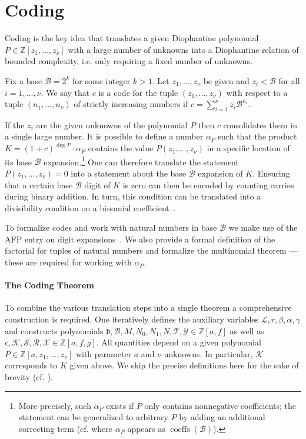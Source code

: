 \documentclass[a4paper,USenglish,cleveref,autoref,thm-restate]{lipics-v2021}
\newcommand{\Z}{{\mathbb Z}}
\newcommand{\B}{\mathscr{B}}
\newcommand{\thmIdec}{\mathscr}
\newcommand{\X}{\thmIdec X}
\newcommand{\K}{\thmIdec K}
\newcommand{\Y}{\thmIdec Y}
\DeclareMathOperator{\coeffs}{coeffs}
\begin{document}
\section{Coding}
Coding is the key idea that translates a given Diophantine polynomial $P \in \Z[z_1, \ldots, z_\nu]$ with a large number of unknowns into a Diophantine relation of bounded complexity, i.e. only requiring a fixed number of unknowns.

\begin{definition}[Code] \label{def:code}
Fix a base $\B = 2^k$ for some integer $k > 1$. Let $z_1, \ldots, z_\nu$ be given and $z_i < \B$ for all $i=1, \ldots, \nu$. We say that $c$ is a code for the tuple $(z_1, \ldots, z_\nu)$ with respect to a tuple $(n_1, \ldots, n_\nu)$ of strictly increasing numbers if $c = \sum_{i=1}^\nu z_i \B^{n_i}$.
\end{definition}

If the $z_i$ are the given unknowns of the polynomial $P$ then $c$ consolidates them in a single large number. It is possible to define a number $\alpha_P$ such that the product $K = (1 + c)^{\deg P} \cdot \alpha_P$ contains the value $P(z_1, \ldots, z_\nu)$ in a specific location of its base $\B$ expansion.\footnote{More precisely, such $\alpha_P$ exists if $P$ only contains nonnegative coefficients; the statement can be generalized to arbitrary $P$ by adding an additional correcting term (cf. \cite[Lemma 1.8]{manuscript} where $\alpha_P$ appears as $\coeffs(\B)$).} One can therefore translate the statement $P(z_1, \ldots, z_\nu) = 0$ into a statement about the base $\B$ expansion of $K$. Ensuring that a certain base $\B$ digit of $K$ is zero can then be encoded by counting carries during binary addition. In turn, this condition can be translated into a divisibility condition on a binomial coefficient~\cite[Lemmas~1.3 and~1.4]{manuscript}. 

To formalize codes and work with natural numbers in base $\B$ we make use of the AFP entry on digit expansions~\cite{afp-digit-expansions}. We also provide a formal definition of the factorial for tuples of natural numbers and formalize the multinomial theorem --- these are required for working with $\alpha_P$.

\paragraph*{The Coding Theorem}
To combine the various translation steps into a single theorem a comprehensive construction is required. One iteratively defines the auxiliary variables $\mathcal{L}, r, \beta, \alpha, \gamma$ and constructs polynomials $\mathfrak{b}, \mathscr{B}, M, N_0, N_1, N, \mathscr{T}, \Y \in \Z[a, f]$ as well as $c, \mathscr{K}, \mathscr{S}, \mathscr{R}, \X \in \Z[a, f, g]$. All quantities depend on a given polynomial $P \in \Z[a, z_1, \ldots, z_\nu]$ with parameter $a$ and $\nu$ unknowns. In particular, $\K$ corresponds to $K$ given above. We skip the precise definitions here for the sake of brevity (cf. \cite[Definition 2.1]{manuscript}). 
\end{document}
